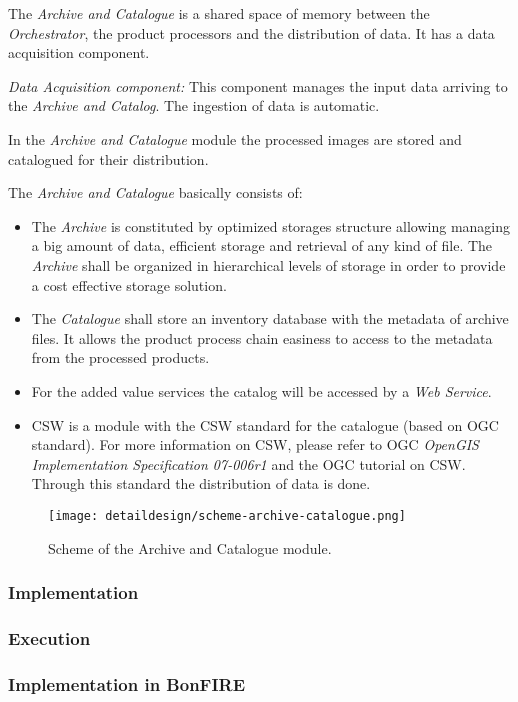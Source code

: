 \begin{enumerate}
The \emph{Archive and Catalogue} is a shared space of memory between the \emph{Orchestrator}, the product processors and the distribution of data. It has a data acquisition component.

\emph{Data Acquisition component:} This component manages the input data arriving to the \emph{Archive and Catalog}. The ingestion of data is automatic.

In the \emph{Archive and Catalogue} module the processed images are stored and catalogued for their distribution.

The \emph{Archive and Catalogue} basically consists of:
\begin{itemize}
\item The \emph{Archive} is constituted by optimized storages structure allowing managing a big amount of data, efficient storage and retrieval of any kind of file. The \emph{Archive} shall be organized in hierarchical levels of storage in order to provide a cost effective storage solution.

\item The \emph{Catalogue} shall store an inventory database with the metadata of archive files. It allows the product process chain easiness to access to the metadata from the processed products.

\item For the added value services the catalog will be accessed by a \emph{Web Service}.

\item \ac{CSW} is a module with the \ac{CSW} standard for the catalogue (based on \ac{OGC} standard). For more information on \ac{CSW}, please refer to \ac{OGC} \emph{OpenGIS Implementation Specification 07-006r1} and the \ac{OGC} tutorial on \ac{CSW}. Through this standard the distribution of data is done.
\end{itemize}

\begin{figure}[!h]
\begin{center}
\texttt{[image: detaildesign/scheme-archive-catalogue.png]}
\caption{Scheme of the Archive and Catalogue module.}
\label{fig:archive-catalogue-scheme}
\end{center}
\end{figure}


\end{enumerate}


\subsubsection{Implementation}

\subsubsection{Execution}

\subsubsection{Implementation in BonFIRE}

